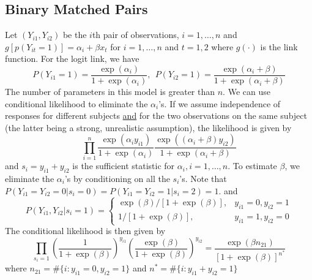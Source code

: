 \documentclass[12pt]{article}
\numberwithin{equation}{section}
\begin{document}
\subsection{Binary Matched Pairs}
Let $(Y_{i1}, Y_{i2})$ be the $i$th pair of observations, $i = 1, \ldots, n$ and $g[p(Y_{it} = 1)] = \alpha_i + \beta x_t$ for $i = 1, \ldots, n$ and $t = 1, 2$ where $g(\cdot)$ is the link function. For the logit link, we have
\begin{equation*}
  P(Y_{i1} = 1) = \frac{\exp(\alpha_i)}{1 + \exp(\alpha_i)}, \ \ 
  P(Y_{i2} = 1) = \frac{\exp(\alpha_i + \beta)}{1 + \exp(\alpha_i + \beta)}
\end{equation*}
%
The number of parameters in this model is greater than $n$. We can use conditional likelihood to eliminate the $\alpha_i$'s. If we assume independence of responses for different subjects \underline{and} for the two observations on the same subject (the latter being a strong, unrealistic assumption), the likelihood is given by
%
\begin{equation*}
  \prod_{i=1}^n \frac{\exp(\alpha_i y_{i1})} {1 + \exp(\alpha_i)}
    \frac{\exp((\alpha_i + \beta) y_{i2})}{1 + \exp(\alpha_i + \beta)}
\end{equation*}
%
and $s_i = y_{i1} + y_{i2}$ is the sufficient statistic for $\alpha_i, i = 1, \ldots, n$. To estimate $\beta$, we eliminate the $\alpha_i$'s by conditioning on all the $s_i$'s. Note that 
$P(Y_{i1} = Y_{i2} = 0 | s_i = 0) = P(Y_{i1} = Y_{i2} = 1 | s_i = 2) = 1$. and
\begin{equation*}
  P(Y_{i1}, Y_{i2} | s_i = 1) =
  \begin{cases}
    \exp(\beta) / [1 + \exp(\beta)], & y_{i1} = 0, y_{i2} = 1 \\
    1 / [1 + \exp(\beta)], & y_{i1} = 1, y_{i2} = 0
  \end{cases}
\end{equation*}
%
%
The conditional likelihood is then given by
\begin{equation*}
  \prod_{s_i = 1} 
  \left(\frac{1}{1 + \exp(\beta)} \right) ^ {y_{i1}} 
  \left( \frac{\exp(\beta)}{1 + \exp(\beta)} \right) ^ {y_{i2}}
  = \frac{\exp(\beta n_{21})}{[1 + \exp(\beta)]^{n^*}}
\end{equation*}
where $n_{21} = \#\{ i : y_{i1} = 0, y_{i2} = 1 \}$ and 
$n^* = \#\{ i : y_{i1} + y_{i2} = 1 \}$
\end{document}
